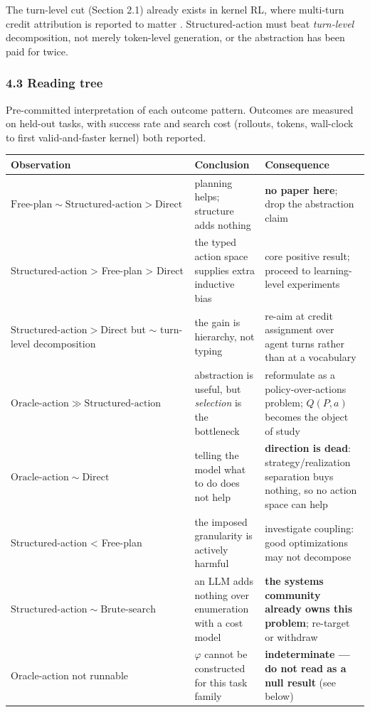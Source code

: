 \documentclass[
  11pt,
]{article}
\begin{document}
The turn-level cut (Section 2.1) already exists in kernel RL, where multi-turn credit attribution is reported to matter \cite{kevin32}. Structured-action must beat \emph{turn-level} decomposition, not merely token-level generation, or the abstraction has been paid for twice.

\hypertarget{reading-tree}{%
\subsubsection{4.3 Reading tree}\label{reading-tree}}

Pre-committed interpretation of each outcome pattern. Outcomes are measured on held-out tasks, with success rate and search cost (rollouts, tokens, wall-clock to first valid-and-faster kernel) both reported.

\begin{longtable}[]{@{}
  >{\raggedright\arraybackslash}p{}
  >{\raggedright\arraybackslash}p{}
  >{\raggedright\arraybackslash}p{}@{}}
\toprule
Observation & Conclusion & Consequence \\
\midrule
\endhead
\(\mathrm{Free\text{-}plan} \sim \mathrm{Structured\text{-}action} > \mathrm{Direct}\) & planning helps; structure adds nothing & \textbf{no paper here}; drop the abstraction claim \\
Structured-action \textgreater{} Free-plan \textgreater{} Direct & the typed action space supplies extra inductive bias & core positive result; proceed to learning-level experiments \\
\(\mathrm{Structured\text{-}action} > \mathrm{Direct}\) but \(\sim\) turn-level decomposition & the gain is hierarchy, not typing & re-aim at credit assignment over agent turns \cite{kevin32} rather than at a vocabulary \\
\(\mathrm{Oracle\text{-}action} \gg \mathrm{Structured\text{-}action}\) & abstraction is useful, but \emph{selection} is the bottleneck & reformulate as a policy-over-actions problem; \(Q(P, a)\) becomes the object of study \\
\(\mathrm{Oracle\text{-}action} \sim \mathrm{Direct}\) & telling the model what to do does not help & \textbf{direction is dead}: strategy/realization separation buys nothing, so no action space can help \\
Structured-action \textless{} Free-plan & the imposed granularity is actively harmful & investigate coupling: good optimizations may not decompose \\
\(\mathrm{Structured\text{-}action} \sim \mathrm{Brute\text{-}search}\) & an LLM adds nothing over enumeration with a cost model & \textbf{the systems community already owns this problem}; re-target or withdraw \\
Oracle-action not runnable & \(\varphi\) cannot be constructed for this task family & \textbf{indeterminate --- do not read as a null result} (see below) \\
\bottomrule
\end{longtable}
\end{document}
